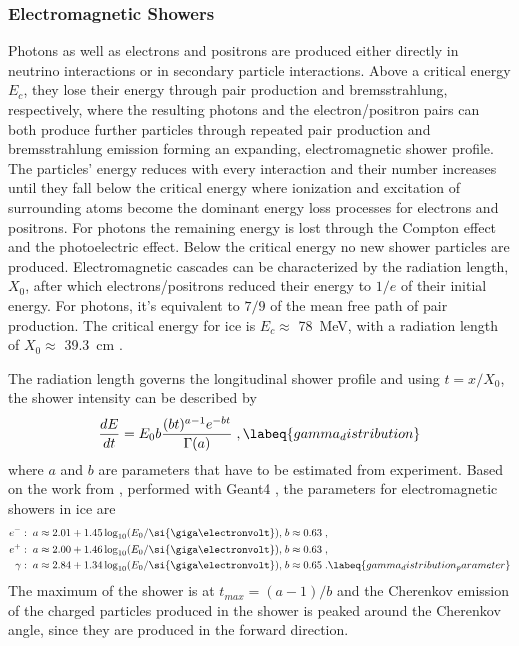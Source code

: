 \subsubsection{Electromagnetic Showers}

Photons as well as electrons and positrons are produced either directly in neutrino interactions or in secondary particle interactions. Above a critical energy $E_c$, they lose their energy through pair production and bremsstrahlung, respectively, where the resulting photons and the electron/positron pairs can both produce further particles through repeated pair production and bremsstrahlung emission forming an expanding, electromagnetic shower profile. The particles' energy reduces with every interaction and their number increases until they fall below the critical energy where ionization and excitation of surrounding atoms become the dominant energy loss processes for electrons and positrons. For photons the remaining energy is lost through the Compton effect and the photoelectric effect.  Below the critical energy no new shower particles are produced. Electromagnetic cascades can be characterized by the radiation length, $X_0$, after which electrons/positrons reduced their energy to $1/e$ of their initial energy. For photons, it's equivalent to $7/9$ of the mean free path of pair production. The critical energy for ice is $E_c \approx$ \SI{78}{\mega\electronvolt}, with a radiation length of $X_0 \approx$ \SI{39.3}{\centi\metre} .

The radiation length governs the longitudinal shower profile and using $t=x/X_{0}$, the shower intensity can be described by 
\begin{equation}
    \frac{dE}{dt} = E_0b \frac{({bt})^{a-1} e^{-bt}}{\Gamma(a)}
    \;,
    \labeq{gamma_distribution}
\end{equation}
where $a$ and $b$ are parameters that have to be estimated from experiment. Based on the work from , performed with Geant4 , the parameters for electromagnetic showers in ice are
\begin{subequations}
    \begin{align}
        e^-: \; a \approx 2.01 + 1.45 \log_{10} (E_0/\si{\giga\electronvolt}),\; & b \approx 0.63 \;, \\
        e^+: \; a \approx 2.00 + 1.46 \log_{10} (E_0/\si{\giga\electronvolt}),\; & b \approx 0.63 \;, \\
        \gamma: \; a \approx 2.84 + 1.34 \log_{10} (E_0/\si{\giga\electronvolt}),\; & b \approx 0.65 \;.
        \labeq{gamma_distribution_parameter}
    \end{align}
\end{subequations}
The maximum of the shower is at $t_{max} = (a-1)/b$ and the Cherenkov emission of the charged particles produced in the shower is peaked around the Cherenkov angle, since they are produced in the forward direction.


